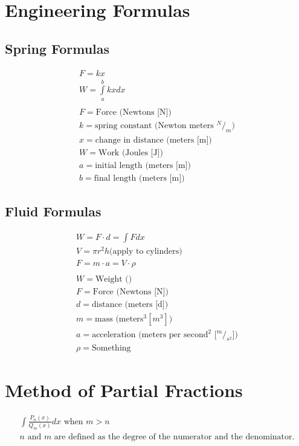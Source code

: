 \documentclass[12pt, letterpaper]{article}
\begin{document}
\section{Engineering Formulas}
\subsection{Spring Formulas}
\begin{gather*}
F = kx\\
W = \int\limits _a^b kx dx\\
\\
F = \text{Force (Newtons [N])}\\
k = \text{spring constant (Newton meters $^N/_m$)}\\
x = \text{change in distance (meters [m])}\\
W = \text{Work (Joules [J])}\\
a = \text{initial length (meters [m])}\\
b = \text{final length (meters [m])}
\end{gather*}

\subsection{Fluid Formulas}
\begin{gather*}
W = F \cdot d = \int\limits F dx\\
V = \pi r^2 h \text{(apply to cylinders)}\\
F = m \cdot a = V \cdot \rho\\
\\
W = \text{Weight ()}\\
F = \text{Force (Newtons [N])}\\
d = \text{distance (meters [d])}\\
m = \text{mass (meters$^3 [m^3]$)}\\
a = \text{acceleration (meters per second$^2$ [$^m/_{s^2}$])}\\
\rho = \text{Something}
\end{gather*}

\section{Method of Partial Fractions}
\begin{gather*}
  \int\limits \frac{P_n (x)}{Q_m (x)} dx \text{ when }m>n\\
  n \text{ and } m \text{ are defined as the degree of the numerator and the denominator.}
\end{gather*}
\end{document}
